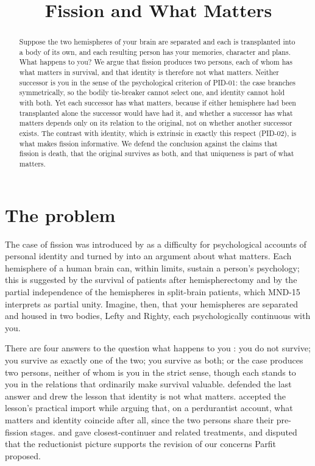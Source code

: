 \documentclass{situationist-preprint}
\title{Fission and What Matters}
\begin{document}
\maketitle

\begin{abstract}
Suppose the two hemispheres of your brain are separated and each is transplanted into a body of its own, and each resulting person has your memories, character and plans. What happens to you? We argue that fission produces two persons, each of whom has what matters in survival, and that identity is therefore not what matters. Neither successor is you in the sense of the psychological criterion of PID-01: the case branches symmetrically, so the bodily tie-breaker cannot select one, and identity cannot hold with both. Yet each successor has what matters, because if either hemisphere had been transplanted alone the successor would have had it, and whether a successor has what matters depends only on its relation to the original, not on whether another successor exists. The contrast with identity, which is extrinsic in exactly this respect (PID-02), is what makes fission informative. We defend the conclusion against the claims that fission is death, that the original survives as both, and that uniqueness is part of what matters.
\end{abstract}

\section{The problem}

The case of fission was introduced by \citet{Wiggins1967} as a difficulty for psychological accounts of personal identity and turned by \citet{Parfit1971} into an argument about what matters. Each hemisphere of a human brain can, within limits, sustain a person's psychology; this is suggested by the survival of patients after hemispherectomy and by the partial independence of the hemispheres in split-brain patients, which MND-15 interprets as partial unity. Imagine, then, that your hemispheres are separated and housed in two bodies, Lefty and Righty, each psychologically continuous with you.

There are four answers to the question what happens to you \citep[ch.~12]{Parfit1984}: you do not survive; you survive as exactly one of the two; you survive as both; or the case produces two persons, neither of whom is you in the strict sense, though each stands to you in the relations that ordinarily make survival valuable. \citet{Parfit1971,Parfit1984} defended the last answer and drew the lesson that identity is not what matters. \citet{Lewis1976} accepted the lesson's practical import while arguing that, on a perdurantist account, what matters and identity coincide after all, since the two persons share their pre-fission stages. \citet{Perry1972} and \citet{Nozick1981} gave closest-continuer and related treatments, and \citet{Johnston1997} disputed that the reductionist picture supports the revision of our concerns Parfit proposed.
\end{document}
